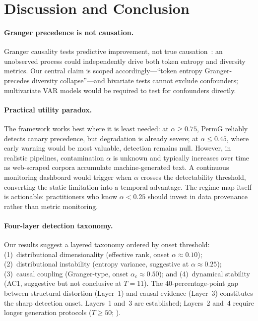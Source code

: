 \section{Discussion and Conclusion}\label{sec:discussion}

\paragraph{Granger precedence is not causation.}
Granger causality tests predictive improvement, not true causation~\cite{granger1969investigating,shojaie2022granger}: an unobserved process could independently drive both token entropy and diversity metrics.
Our central claim is scoped accordingly---``token entropy Granger-precedes diversity collapse''---and bivariate tests cannot exclude confounders; multivariate VAR models would be required to test for confounders directly.

\paragraph{Practical utility paradox.}
The framework works best where it is least needed: at $\alpha{\geq}0.75$, PermG reliably detects canary precedence, but degradation is already severe; at $\alpha{\leq}0.45$, where early warning would be most valuable, detection remains null.
However, in realistic pipelines, contamination $\alpha$ is unknown and typically increases over time as web-scraped corpora accumulate machine-generated text.
A continuous monitoring dashboard would trigger when $\alpha$ crosses the detectability threshold, converting the static limitation into a temporal advantage.
The regime map itself is actionable: practitioners who know $\alpha{<}0.25$ should invest in data provenance rather than metric monitoring.

\paragraph{Four-layer detection taxonomy.}
Our results suggest a layered taxonomy ordered by onset threshold:
(1)~distributional dimensionality (effective rank, onset $\alpha{\approx}0.10$);
(2)~distributional instability (entropy variance, suggestive at $\alpha{\approx}0.25$);
(3)~causal coupling (Granger-type, onset $\alpha_c{\approx}0.50$); and
(4)~dynamical stability (AC1, suggestive but not conclusive at $T{=}11$).
The 40-percentage-point gap between structural distortion (Layer~1) and causal evidence (Layer~3) constitutes the sharp detection onset.
Layers~1 and~3 are established; Layers~2 and~4 require longer generation protocols ($T{\geq}50$; \citealt{dakos2012methods}).

